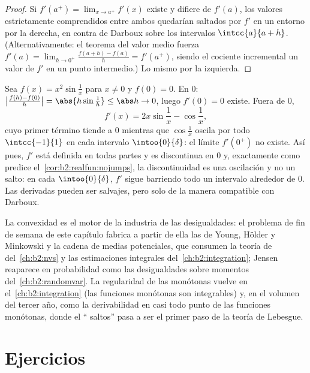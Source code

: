 \begin{proof}
Si $f'(a^+) = \lim_{x\to a^+} f'(x)$ existe y difiere de $f'(a)$,
los valores estrictamente comprendidos entre ambos quedarían
saltados por $f'$ en un entorno por la derecha, en contra de Darboux
sobre los intervalos $\intcc{a}{a + h}$. (Alternativamente: el
teorema del valor medio fuerza $f'(a) = \lim_{h\to0^+}
\frac{f(a+h)-f(a)}{h} = f'(a^+)$, siendo el cociente incremental un
valor de $f'$ en un punto intermedio.) Lo mismo por la izquierda.
\end{proof}

\begin{example}\label{ex:b2:realfun:oscillation}
Sea $f(x) = x^2\sin\frac1x$ para $x \neq 0$ y $f(0) = 0$. En $0$:
$\bigl|\frac{f(h) - f(0)}{h}\bigr| = \abs{h\sin\frac1h} \leq \abs h
\to 0$, luego $f'(0) = 0$ existe. Fuera de $0$,
\[
f'(x) = 2x\sin\frac1x - \cos\frac1x ,
\]
cuyo primer término tiende a $0$ mientras que $\cos\frac1x$ oscila
por todo $\intcc{-1}{1}$ en cada intervalo $\intoo{0}{\delta}$: el
límite $f'(0^+)$ no existe. Así pues, $f'$ está definida en todas
partes y es discontinua en $0$ y, exactamente como predice el~\cref{cor:b2:realfun:nojumps}, la discontinuidad es una oscilación y
no un salto: en cada $\intoo{0}{\delta}$, $f'$ sigue barriendo todo
un intervalo alrededor de $0$. Las derivadas pueden ser salvajes,
pero solo de la manera compatible con Darboux.
\end{example}

\begin{remark}
La convexidad es el motor de la industria de las desigualdades: el
problema de fin de semana de este capítulo fabrica a partir de ella
las de Young, Hölder y Minkowski y la cadena de medias potenciales,
que consumen la teoría de  del~\cref{ch:b2:nvs} y las
estimaciones integrales del~\cref{ch:b2:integration}; Jensen
reaparece en probabilidad como las desigualdades sobre momentos del~\cref{ch:b2:randomvar}. La regularidad de las monótonas vuelve en el~\cref{ch:b2:integration} (las funciones monótonas son integrables)
y, en el volumen del tercer año, como la derivabilidad en casi todo
punto de las funciones monótonas, donde el `` saltos'' pasa
a ser el primer paso de la teoría de Lebesgue.
\end{remark}

\section{Ejercicios}

